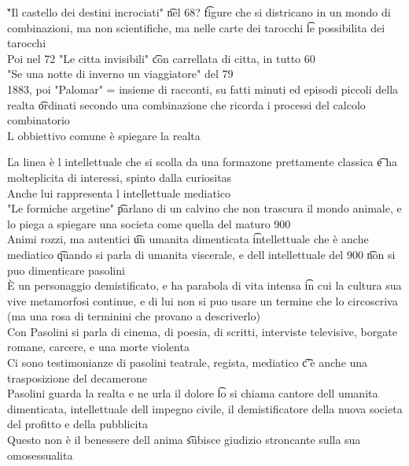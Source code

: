 \documentclass[12pt]{article}
\begin{document}
\v

"Il castello dei destini incrociati" \t nel 68? \t figure che si districano in un mondo di combinazioni, ma non scientifiche, ma nelle carte dei tarocchi \t le possibilita dei tarocchi \\
Poi nel 72 "Le citta invisibili" \t con carrellata di citta, in tutto 60 \\
"Se una notte di inverno un viaggiatore" del 79 \\
1883, poi "Palomar" = insieme di racconti, su fatti minuti ed episodi piccoli della realta \t ordinati secondo una combinazione che ricorda i processi del calcolo combinatorio \\
L obbiettivo comune è spiegare la realta 

\v

La linea è l intellettuale che si scolla da una formazone prettamente classica \t e ha molteplicita di interessi, spinto dalla curiositas \\
Anche lui rappresenta l intellettuale mediatico \\
"Le formiche argetine" \t parlano di un calvino che non trascura il mondo animale, e lo piega a spiegare una societa come quella del maturo 900 \\

\s[Pasolini]
Animi rozzi, ma autentici \t un umanita dimenticata \t intellettuale che è anche mediatico \t quando si parla di umanita viscerale, e dell intellettuale del 900 \t non si puo dimenticare pasolini \\
È un personaggio demistificato, e ha parabola di vita intensa \t in cui la cultura sua vive metamorfosi continue, e di lui non si puo usare un termine che lo circoscriva (ma una rosa di terminini che provano a descriverlo) \\
Con Pasolini si parla di cinema, di poesia, di scritti, interviste televisive, borgate romane, carcere, e una morte violenta \\
Ci sono testimonianze di pasolini teatrale, regista, mediatico \t c'è anche una trasposizione del decamerone \\
Pasolini guarda la realta e ne urla il dolore \t lo si chiama cantore dell umanita dimenticata, intellettuale dell impegno civile, il demistificatore della nuova societa del profitto e della pubblicita \\
Questo non è il benessere dell anima \t subisce giudizio stroncante sulla sua omosessualita
\end{document}
